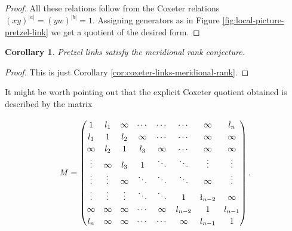 \documentclass{article}
\newtheorem{corollary}[theorem]{Corollary}
\theoremstyle{definition}
\begin{document}
\begin{proof}
All these relations follow from the Coxeter relations $(xy)^{|a|} = (yw)^{|b|} = 1$. Assigning generators as in Figure \ref{fig:local-picture-pretzel-link} we get a quotient of the desired form.
\end{proof}

\begin{corollary}
Pretzel links satisfy the meridional rank conjecture.
\end{corollary}

\begin{proof}
This is just Corollary \ref{cor:coxeter-links-meridional-rank}.
\end{proof}

It might be worth pointing out that the explicit Coxeter quotient obtained is described by the matrix

$$
\renewcommand\arraystretch{1.2}
M = \left( \begin{matrix}
1 & l_1 & \infty & \cdots & \cdots &\cdots & \infty & l_n \\
l_1 & 1 & l_2 & \infty & \cdots & \cdots & \infty & \infty \\
\infty & l_2 & 1 & l_3 & \infty &\cdots & \infty & \infty \\
\vdots & \infty  & l_3 & 1 & \ddots & \ddots & \vdots & \vdots \\
\vdots & \vdots & \infty & \ddots & \ddots & \ddots & \infty & \vdots \\
\vdots & \vdots & \vdots & \ddots &\ddots & 1 & \l_{n-2} & \infty \\
\infty & \infty & \infty & \cdots & \infty & l_{n-2} & 1 & l_{n-1} \\
l_n & \infty & \infty & \cdots & \cdots & \infty  & l_{n-1} & 1
\end{matrix} \right).$$

\newpage



\end{document}
